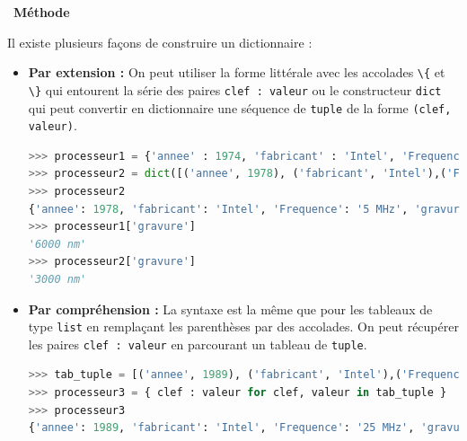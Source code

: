 \documentclass[
  11pt,
]{article}
\newcommand{\passthrough}[1]{#1}
\newenvironment{methode}[1]
{\par \medskip    \noindent  
 \begin {bclogo}[arrondi =0.1,logo=\bcoutil, marge=4,noborder = true] {~\textbf{Méthode}   {\itshape #1} }  \par}
{
\end{bclogo}
 \par \bigskip }
\begin{document}
\begin{methode}{}

Il existe plusieurs façons de construire un dictionnaire :

\begin{itemize}
\item
  \textbf{Par extension :} On peut utiliser la forme littérale avec les
  accolades \passthrough{\lstinline!\{!} et \passthrough{\lstinline!\}!}
  qui entourent la série des paires
  \passthrough{\lstinline!clef : valeur!} ou le constructeur
  \passthrough{\lstinline!dict!} qui peut convertir en dictionnaire une
  séquence de \passthrough{\lstinline!tuple!} de la forme
  \passthrough{\lstinline!(clef, valeur)!}.

\begin{lstlisting}[language=Python]
>>> processeur1 = {'annee' : 1974, 'fabricant' : 'Intel', 'Frequence' : '2 MHz','gravure' : '6000 nm', 'architecture' : '8080'}
>>> processeur2 = dict([('annee', 1978), ('fabricant', 'Intel'),('Frequence','5 MHz'),('gravure','3 micrometres'),('architecture','8086')])
>>> processeur2
{'annee': 1978, 'fabricant': 'Intel', 'Frequence': '5 MHz', 'gravure': '3000 nm', 'architecture': '8086'}
>>> processeur1['gravure']
'6000 nm'
>>> processeur2['gravure']
'3000 nm'
\end{lstlisting}
\item
  \textbf{Par compréhension :} La syntaxe est la même que pour les
  tableaux de type \passthrough{\lstinline!list!} en remplaçant les
  parenthèses par des accolades. On peut récupérer les paires
  \passthrough{\lstinline!clef : valeur!} en parcourant un tableau de
  \passthrough{\lstinline!tuple!}.

\begin{lstlisting}[language=Python]
>>> tab_tuple = [('annee', 1989), ('fabricant', 'Intel'),('Frequence','25 MHz'),('gravure','600 nm'),('architecture','80486')]
>>> processeur3 = { clef : valeur for clef, valeur in tab_tuple }
>>> processeur3
{'annee': 1989, 'fabricant': 'Intel', 'Frequence': '25 MHz', 'gravure': '600 nm', 'architecture': '80486'}
\end{lstlisting}
\end{itemize}

\end{methode}
\end{document}
